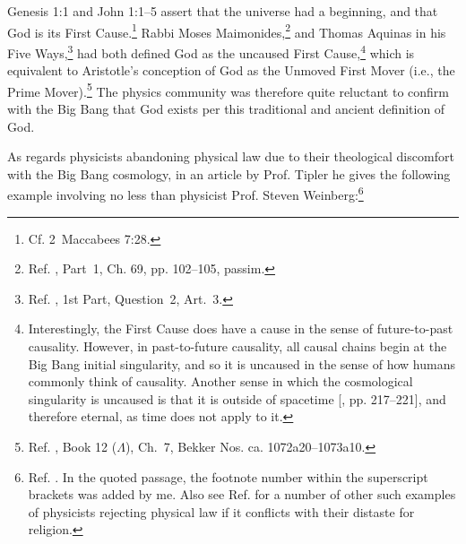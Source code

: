 \documentclass[letterpaper,12pt]{article}
\begin{document}
Genesis 1:1 and John 1:1--5 assert that the universe had a beginning, and that God is its First Cause.\footnote{Cf. 2~Maccabees 7:28.} Rabbi Moses Maimonides,\footnote{Ref. , Part~1, Ch. 69, pp. 102--105, passim.} and Thomas Aquinas in his Five Ways,\footnote{Ref. , 1st Part, Question~2, Art.~3.} had both defined God as the uncaused First Cause,\footnote{Interestingly, the First Cause does have a cause in the sense of future-to-past causality. However, in past-to-future causality, all causal chains begin at the Big Bang initial singularity, and so it is uncaused in the sense of how humans commonly think of causality. Another sense in which the cosmological singularity is uncaused is that it is outside of spacetime [, pp. 217--221], and therefore eternal, as time does not apply to it.} which is equivalent to Aristotle's conception of God as the Unmoved First Mover (i.e., the Prime Mover).\footnote{Ref. , Book 12 (\( \Lambda \)), Ch.~7, Bekker Nos. ca. 1072a20--1073a10.} The physics community was therefore quite reluctant to confirm with the Big Bang that God exists per this traditional and ancient definition of God.

As regards physicists abandoning physical law due to their theological discomfort with the Big Bang cosmology, in an article by Prof. Tipler he gives the following example involving no less than physicist Prof. Steven Weinberg:\footnote{Ref. . In the quoted passage, the footnote number within the superscript brackets was added by me. Also see Ref.  for a number of other such examples of physicists rejecting physical law if it conflicts with their distaste for religion.}
\end{document}
